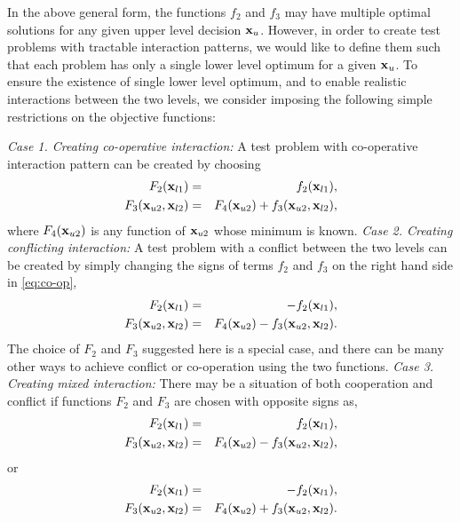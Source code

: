 \documentclass[twoside]{article}
\begin{document}
In the above general form, the functions $f_2$ and $f_3$ may have multiple optimal solutions for any given upper level decision $\mbox{$\mathbf{x}$}_u$. However, in order to create test problems with tractable interaction patterns, we would like to define them such that each problem has only a single lower level optimum for a given $\mbox{$\mathbf{x}$}_u$. To ensure the existence of single lower level optimum, and to enable realistic interactions between the two levels, we consider imposing the following simple restrictions on the objective functions:

\vskip 0.2cm
\textit{Case 1. Creating co-operative interaction: }
A test problem with co-operative interaction pattern can be created by choosing 
\begin{eqnarray}\label{eq:co-op}
F_2(\mbox{$\mathbf{x}$}_{l1}) &=& f_2(\mbox{$\mathbf{x}$}_{l1}), \\
F_3(\mbox{$\mathbf{x}$}_{u2},\mbox{$\mathbf{x}$}_{l2}) &=& F_4(\mbox{$\mathbf{x}$}_{u2})+f_3(\mbox{$\mathbf{x}$}_{u2},\mbox{$\mathbf{x}$}_{l2}) \nonumber,
\end{eqnarray}
where $F_4(\mbox{$\mathbf{x}$}_{u2})$ is any function of $\mbox{$\mathbf{x}$}_{u2}$ whose minimum is known. 
\vskip 0.2cm
\textit{Case 2. Creating conflicting interaction: } 
A test problem with a conflict between the two levels can be created by simply changing the signs of terms $f_2$ and $f_3$  on the right hand side in \eqref{eq:co-op},
\begin{eqnarray}
F_2(\mbox{$\mathbf{x}$}_{l1}) &=& -f_2(\mbox{$\mathbf{x}$}_{l1}), \\
F_3(\mbox{$\mathbf{x}$}_{u2},\mbox{$\mathbf{x}$}_{l2}) &=& F_4(\mbox{$\mathbf{x}$}_{u2})-f_3(\mbox{$\mathbf{x}$}_{u2},\mbox{$\mathbf{x}$}_{l2}). \nonumber
\end{eqnarray}
The choice of $F_2$ and $F_3$ suggested here is a special case, and there can be many other ways to achieve conflict or co-operation using the two functions.
\vskip 0.2cm
\textit{Case 3. Creating mixed interaction: } 
There may be a situation of both cooperation and conflict if functions $F_2$ and $F_3$ are chosen with opposite signs as,
\begin{eqnarray}
F_2(\mbox{$\mathbf{x}$}_{l1}) &=& f_2(\mbox{$\mathbf{x}$}_{l1}),\\
F_3(\mbox{$\mathbf{x}$}_{u2},\mbox{$\mathbf{x}$}_{l2})&=&F_4(\mbox{$\mathbf{x}$}_{u2})-f_3(\mbox{$\mathbf{x}$}_{u2},\mbox{$\mathbf{x}$}_{l2}),\nonumber
\end{eqnarray}
or 
\begin{eqnarray}
F_2(\mbox{$\mathbf{x}$}_{l1})&=& -f_2(\mbox{$\mathbf{x}$}_{l1}),\\
F_3(\mbox{$\mathbf{x}$}_{u2},\mbox{$\mathbf{x}$}_{l2})&=&F_4(\mbox{$\mathbf{x}$}_{u2})+f_3(\mbox{$\mathbf{x}$}_{u2},\mbox{$\mathbf{x}$}_{l2}).\nonumber
\end{eqnarray}
\vskip 0.2cm
\end{document}
